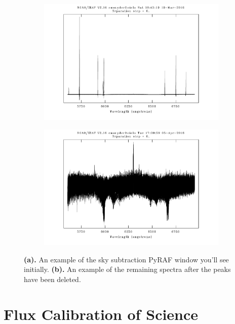 \documentclass[12pt]{report}
\begin{document}
\begin{figure}[t]
\centering
\begin{subfigure}[t]{0.49\textwidth}
\includegraphics[width=\textwidth]{skysub_before}
\end{subfigure}
\hfill
\begin{subfigure}[t]{0.49\textwidth}
\includegraphics[width=\textwidth]{newskysubexample}
\end{subfigure}
\caption[Examples of sky subtraction]{\textbf{(a).} An example of the sky subtraction PyRAF window you'll see initially. \textbf{(b).} An example of the remaining spectra after the peaks have been deleted.}
\label{fig:skysub}
\end{figure}

\bigskip
\section{Flux Calibration of Science}
\end{document}
